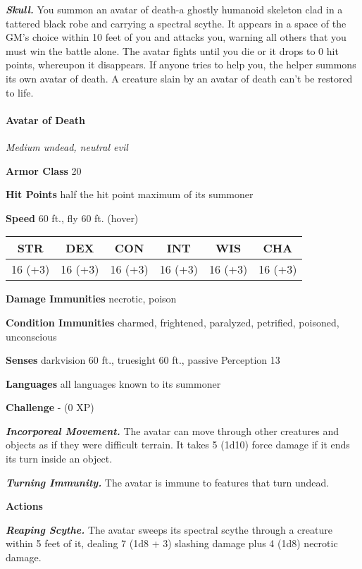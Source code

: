 \documentclass[
]{article}
\begin{document}
\emph{\textbf{Skull.}} You summon an avatar of death-a ghostly humanoid
skeleton clad in a tattered black robe and carrying a spectral scythe.
It appears in a space of the GM's choice within 10 feet of you and
attacks you, warning all others that you must win the battle alone. The
avatar fights until you die or it drops to 0 hit points, whereupon it
disappears. If anyone tries to help you, the helper summons its own
avatar of death. A creature slain by an avatar of death can't be
restored to life.

\hypertarget{avatar-of-death}{%
\paragraph{Avatar of Death}\label{avatar-of-death}}

\emph{Medium undead, neutral evil}

\textbf{Armor Class} 20

\textbf{Hit Points} half the hit point maximum of its summoner

\textbf{Speed} 60 ft., fly 60 ft. (hover)

\begin{longtable}[]{@{}cccccc@{}}
\toprule
STR & DEX & CON & INT & WIS & CHA\tabularnewline
\midrule
\endhead
16 (+3) & 16 (+3) & 16 (+3) & 16 (+3) & 16 (+3) & 16 (+3)\tabularnewline
\bottomrule
\end{longtable}

\textbf{Damage Immunities} necrotic, poison

\textbf{Condition Immunities} charmed, frightened, paralyzed, petrified,
poisoned, unconscious

\textbf{Senses} darkvision 60 ft., truesight 60 ft., passive Perception
13

\textbf{Languages} all languages known to its summoner

\textbf{Challenge} - (0 XP)

\emph{\textbf{Incorporeal Movement.}} The avatar can move through other
creatures and objects as if they were difficult terrain. It takes 5
(1d10) force damage if it ends its turn inside an object.

\emph{\textbf{Turning Immunity.}} The avatar is immune to features that
turn undead.

\textbf{Actions}

\emph{\textbf{Reaping Scythe.}} The avatar sweeps its spectral scythe
through a creature within 5 feet of it, dealing 7 (1d8 + 3) slashing
damage plus 4 (1d8) necrotic damage.
\end{document}
